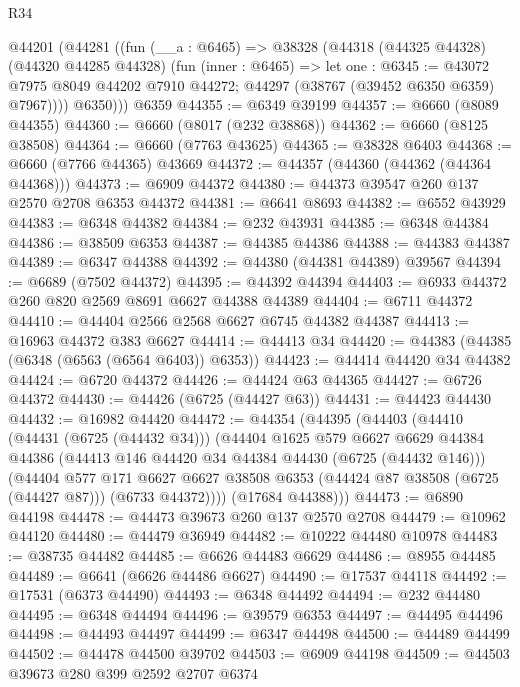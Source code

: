 \begin{lexlean}{R34}
\begin{coremodule}
    @44201
      (@44281
        ((fun (__a : @6465) =>
        @38328
          (@44318
            (@44325 @44328)
            (@44320 @44285 @44328)
            (fun (inner : @6465) =>
            let one : @6345 := @43072 @7975 @8049 @44202 @7910 @44272;
            @44297 (@38767 (@39452 @6350 @6359) @7967))))
          @6350)))
    @6359
@44355 := @6349 @39199
@44357 := @6660 (@8089 @44355)
@44360 := @6660 (@8017 (@232 @38868))
@44362 := @6660 (@8125 @38508)
@44364 := @6660 (@7763 @43625)
@44365 := @38328 @6403
@44368 := @6660 (@7766 @44365) @43669
@44372 := @44357 (@44360 (@44362 (@44364 @44368)))
@44373 := @6909 @44372
@44380 := @44373 @39547 @260 @137 @2570 @2708 @6353 @44372
@44381 := @6641 @8693
@44382 := @6552 @43929
@44383 := @6348 @44382
@44384 := @232 @43931
@44385 := @6348 @44384
@44386 := @38509 @6353
@44387 := @44385 @44386
@44388 := @44383 @44387
@44389 := @6347 @44388
@44392 := @44380 (@44381 @44389) @39567
@44394 := @6689 (@7502 @44372)
@44395 := @44392 @44394
@44403 := @6933 @44372 @260 @820 @2569 @8691 @6627 @44388 @44389
@44404 := @6711 @44372
@44410 := @44404 @2566 @2568 @6627 @6745 @44382 @44387
@44413 := @16963 @44372 @383 @6627
@44414 := @44413 @34
@44420 := @44383 (@44385 (@6348 (@6563 (@6564 @6403)) @6353))
@44423 := @44414 @44420 @34 @44382
@44424 := @6720 @44372
@44426 := @44424 @63 @44365
@44427 := @6726 @44372
@44430 := @44426 (@6725 (@44427 @63))
@44431 := @44423 @44430
@44432 := @16982 @44420
@44472 := @44354
    (@44395
      (@44403
        (@44410
          (@44431 (@6725 (@44432 @34)))
          (@44404
            @1625
            @579
            @6627
            @6629
            @44384
            @44386
            (@44413 @146 @44420 @34 @44384 @44430 (@6725 (@44432 @146)))
            (@44404
              @577
              @171
              @6627
              @6627
              @38508
              @6353
              (@44424 @87 @38508 (@6725 (@44427 @87)))
              (@6733 @44372))))
        (@17684 @44388)))
@44473 := @6890 @44198
@44478 := @44473 @39673 @260 @137 @2570 @2708
@44479 := @10962 @44120
@44480 := @44479 @36949
@44482 := @10222 @44480 @10978
@44483 := @38735 @44482
@44485 := @6626 @44483 @6629
@44486 := @8955 @44485
@44489 := @6641 (@6626 @44486 @6627)
@44490 := @17537 @44118
@44492 := @17531 (@6373 @44490)
@44493 := @6348 @44492
@44494 := @232 @44480
@44495 := @6348 @44494
@44496 := @39579 @6353
@44497 := @44495 @44496
@44498 := @44493 @44497
@44499 := @6347 @44498
@44500 := @44489 @44499
@44502 := @44478 @44500 @39702
@44503 := @6909 @44198
@44509 := @44503 @39673 @280 @399 @2592 @2707 @6374

\end{coremodule}
\end{lexlean}
